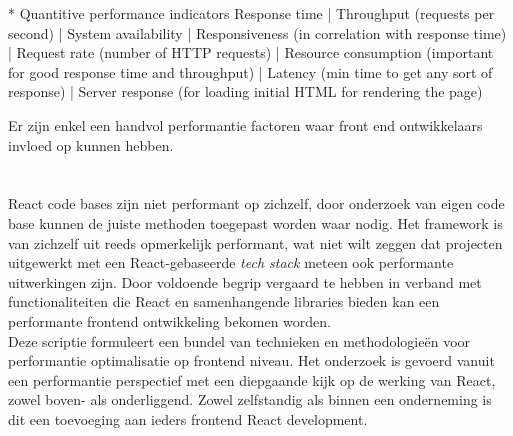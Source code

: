 * Quantitive performance indicators
Response time | Throughput (requests per second) | System availability | Responsiveness (in correlation with response time) | Request rate (number of HTTP requests) | Resource consumption (important for good response time and throughput) | Latency (min time to get any sort of response) | Server response (for loading initial HTML for rendering the page)

Er zijn enkel een handvol performantie factoren waar front end ontwikkelaars invloed op kunnen hebben.

\subsection{}
\label{sec:optimalisatie}



\subsection{}
\label{sec:problemen&testen}



\section{}
\label{sec:probleemstelling}

React code bases zijn niet performant op zichzelf, door onderzoek van eigen code base kunnen de juiste methoden toegepast worden waar nodig. Het framework is van zichzelf uit reeds opmerkelijk performant, wat niet wilt zeggen dat projecten uitgewerkt met een React-gebaseerde \emph{tech stack} meteen ook performante uitwerkingen zijn. Door voldoende begrip vergaard te hebben in verband met functionaliteiten die React en samenhangende libraries bieden kan een performante frontend ontwikkeling bekomen worden. \\
Deze scriptie formuleert een bundel van technieken en methodologieën voor performantie optimalisatie op frontend niveau. Het onderzoek is gevoerd vanuit een performantie perspectief met een diepgaande kijk op de werking van React, zowel boven- als onderliggend. Zowel zelfstandig als binnen een onderneming is dit een toevoeging aan ieders frontend React development.

\section{}
\label{sec:korteToenadering}

